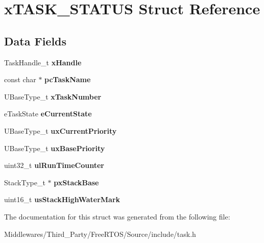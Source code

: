 \hypertarget{structx_t_a_s_k___s_t_a_t_u_s}{}\section{x\+T\+A\+S\+K\+\_\+\+S\+T\+A\+T\+US Struct Reference}
\label{structx_t_a_s_k___s_t_a_t_u_s}
\subsection*{Data Fields}
\begin{DoxyCompactItemize}
\item 
\mbox{\label{structx_t_a_s_k___s_t_a_t_u_s_a01ba122aba7d048809e2330ee6cbe218}} 
Task\+Handle\+\_\+t {\bfseries x\+Handle}
\item 
\mbox{\label{structx_t_a_s_k___s_t_a_t_u_s_a8a708f6c3c531b149994cc0a04dd009e}} 
const char $\ast$ {\bfseries pc\+Task\+Name}
\item 
\mbox{\label{structx_t_a_s_k___s_t_a_t_u_s_a93c24142b1453d7b03cc172a24cf1ecf}} 
U\+Base\+Type\+\_\+t {\bfseries x\+Task\+Number}
\item 
\mbox{\label{structx_t_a_s_k___s_t_a_t_u_s_a32c7e5be97ece2b399c1ec6e1a9293cc}} 
e\+Task\+State {\bfseries e\+Current\+State}
\item 
\mbox{\label{structx_t_a_s_k___s_t_a_t_u_s_abfe5b9f886928c5b97be2c0d7e464ffa}} 
U\+Base\+Type\+\_\+t {\bfseries ux\+Current\+Priority}
\item 
\mbox{\label{structx_t_a_s_k___s_t_a_t_u_s_a2278f10f240db68c88ed8bed4db8d565}} 
U\+Base\+Type\+\_\+t {\bfseries ux\+Base\+Priority}
\item 
\mbox{\label{structx_t_a_s_k___s_t_a_t_u_s_adc6f8d40a907816923c626eaf470a359}} 
uint32\+\_\+t {\bfseries ul\+Run\+Time\+Counter}
\item 
\mbox{\label{structx_t_a_s_k___s_t_a_t_u_s_a564f05b11b344080b229890ec35ef674}} 
Stack\+Type\+\_\+t $\ast$ {\bfseries px\+Stack\+Base}
\item 
\mbox{\label{structx_t_a_s_k___s_t_a_t_u_s_a594a78a1e02171ab2f917122abc288c2}} 
uint16\+\_\+t {\bfseries us\+Stack\+High\+Water\+Mark}
\end{DoxyCompactItemize}


The documentation for this struct was generated from the following file\+:\begin{DoxyCompactItemize}
\item 
Middlewares/\+Third\+\_\+\+Party/\+Free\+R\+T\+O\+S/\+Source/include/task.\+h\end{DoxyCompactItemize}
